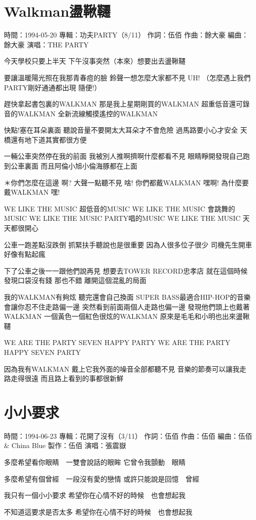 \documentclass[UTF8,a4paper,oneside,twocolumn,12pt]{ctexbook}
\newcommand{\infopair}[2]{\textbullet #1：#2}
\newcommand{\zc}[1][伍佰]{\infopair{作詞}{#1}}
\newcommand{\zq}[1][伍佰]{\infopair{作曲}{#1}}
\newcommand{\bq}[1][伍佰]{\infopair{編曲}{#1}}
\newcommand{\zj}[1]{\infopair{專輯}{#1}}
\newcommand{\zz}[1]{\infopair{製作}{#1}}
\newcommand{\sj}[1]{\infopair{時間}{#1}}
\newenvironment{info}{\begin{flushleft}\kaishu
	}
	{\end{flushleft}\normalsize\yahei\par}
\newenvironment{lyric}{
	}
{}
\begin{document}
\section{Walkman盪鞦韆}
\begin{info}
	\sj{1994-05-20}
	\zj{功夫PARTY（8/11）}
	\zc
	\zq[餘大豪]
	\bq[餘大豪]
	\infopair{演唱}{THE PARTY}
\end{info}
\begin{lyric}
	今天學校只要上半天
	下午沒事突然（本來）想要出去盪鞦韆

	要讓溫暖陽光照在我那青春痘的臉
	鈴聲一想怎麼大家都不見 UH!
	（怎麼遇上我們PARTY剛好通通都出現 隨便!）

	趕快拿起書包裏的WALKMAN
	那是我上星期剛買的WALKMAN
	超重低音還可錄音的WALKMAN
	全新流線觸摸遙控的WALKMAN

	快點!塞在耳朵裏面 聽說音量不要開太大耳朵才不會危險
	過馬路要小心才安全 天橋還有地下道其實都很方便

	一輛公車突然停在我的前面
	我被別人推啊擠啊什麼都看不見
	眼睛睜開發現自己跑到公車裏面
	而且阿倫小旭小倫海豚都在上面

	＊你們怎麼在這邊 啊?
	大聲一點聽不見 啥!
	你們都戴WALKMAN 嘿啊!
	為什麼要戴WALKMAN 嘿!

	WE LIKE THE MUSIC 超低音的MUSIC
	WE LIKE THE MUSIC 會跳舞的MUSIC
	WE LIKE THE MUSIC PARTY唱的MUSIC
	WE LIKE THE MUSIC 天天都很開心

	公車一跑差點沒跌倒 抓緊扶手聽說也是很重要
	因為人很多位子很少 司機先生開車好像有點起瘋

	下了公車之後一一跟他們說再見
	想要去TOWER RECORD忠孝店
	就在這個時候發現口袋沒有錢 那也不錯
	離開這個混亂的局面

	我的WALKMAN有夠炫 聽完還會自己換面
	SUPER BASS最適合HIP-HOP的音樂
	會讓你忍不住走路偏一邊 突然看到前面兩個人走路也偏一邊
	發現他們頭上也戴著WALKMAN
	一個黃色一個紅色很炫的WALKMAN
	原來是毛毛和小明也出來盪鞦韆

	WE ARE THE PARTY
	SEVEN HAPPY PARTY
	WE ARE THE PARTY
	HAPPY SEVEN PARTY

	因為我有WALKMAN
	戴上它我外面的噪音全部都聽不見
	音樂的節奏可以讓我走路走得很遠
	而且路上看到的事都很新鮮
\end{lyric}

\section{小小要求}
\begin{info}
	\sj{1994-06-23}
	\zj{花開了沒有（3/11）}
	\zc
	\zq
	\bq[伍佰 \& China Blue]
	\zz{伍佰}
	\infopair{演唱}{張震嶽}
\end{info}
\begin{lyric}
	多麼希望看你眼睛　一雙會說話的眼眸
	它曾令我顫動　眼睛

	多麼希望有個曾經　一段沒有愛的戀情
	或許只能說是回憶　曾經

	我只有一個小小要求
	希望你在心情不好的時候　也會想起我

	不知道這要求是否太多
	希望你在心情不好的時候　也會想起我
\end{lyric}
\end{document}
